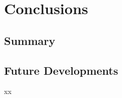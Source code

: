 \chapter{Conclusions} \label{chap6}

\section{Summary} \label{6summary}



\section{Future Developments} \label{6futuredevelopments}

xx

